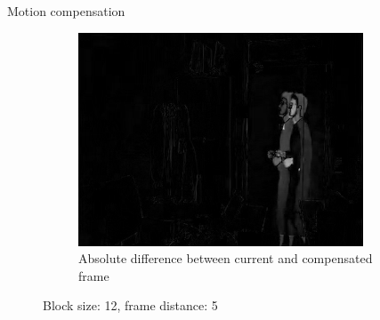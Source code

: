 \documentclass[aspectratio=1610,xcolor=dvipsnames]{beamer}
\begin{document}
\begin{frame}{Motion compensation}
\begin{figure}[htbp]
\begin{subfigure}[b]{0.3\textwidth}
            \includegraphics[width=.9\textwidth]{images/pan240-diff-curr-comp.png}
            \caption{Absolute difference between current and compensated frame}
            \label{fig:pan240-diff-curr-comp}
        \end{subfigure}
    
        \caption{Block size: 12, frame distance: 5}
    \end{figure}
\end{frame}
\end{document}
